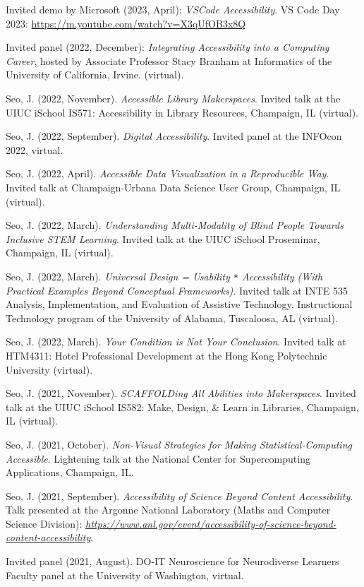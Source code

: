 \documentclass[11pt,a4paper,]{awesome-cv}
\begin{document}
Invited demo by Microsoft (2023, April): \emph{VSCode Accessibility}. VS
Code Day 2023: \url{https://m.youtube.com/watch?v=X3qUfOB3x8Q}

Invited panel (2022, December): \emph{Integrating Accessibility into a
Computing Career}, hosted by Associate Professor Stacy Branham at
Informatics of the University of California, Irvine. (virtual).

Seo, J. (2022, November). \emph{Accessible Library Makerspaces}. Invited
talk at the UIUC iSchool IS571: Accessibility in Library Resources,
Champaign, IL (virtual).

Seo, J. (2022, September). \emph{Digital Accessibility}. Invited panel
at the INFOcon 2022, virtual.

Seo, J. (2022, April). \emph{Accessible Data Visualization in a
Reproducible Way}. Invited talk at Champaign-Urbana Data Science User
Group, Champaign, IL (virtual).

Seo, J. (2022, March). \emph{Understanding Multi-Modality of Blind
People Towards Inclusive STEM Learning}. Invited talk at the UIUC
iSchool Proseminar, Champaign, IL (virtual).

Seo, J. (2022, March). \emph{Universal Design = Usability \texttt{*}
Accessibility (With Practical Examples Beyond Conceptual Frameworks)}.
Invited talk at INTE 535 Analysis, Implementation, and Evaluation of
Assistive Technology. Instructional Technology program of the University
of Alabama, Tuscaloosa, AL (virtual).

Seo, J. (2022, March). \emph{Your Condition is Not Your Conclusion}.
Invited talk at HTM4311: Hotel Professional Development at the Hong Kong
Polytechnic University (virtual).

Seo, J. (2021, November). \emph{SCAFFOLDing All Abilities into
Makerspaces}. Invited talk at the UIUC iSchool IS582: Make, Design, \&
Learn in Libraries, Champaign, IL (virtual).

Seo, J. (2021, October). \emph{Non-Visual Strategies for Making
Statistical-Computing Accessible}. Lightening talk at the National
Center for Supercomputing Applications, Champaign, IL.

Seo, J. (2021, September). \emph{Accessibility of Science Beyond Content
Accessibility}. Talk presented at the Argonne National Laboratory (Maths
and Computer Science Division):
\emph{\url{https://www.anl.gov/event/accessibility-of-science-beyond-content-accessibility}}.

Invited panel (2021, August). DO-IT Neuroscience for Neurodiverse
Learners Faculty panel at the University of Washington, virtual.
\end{document}
